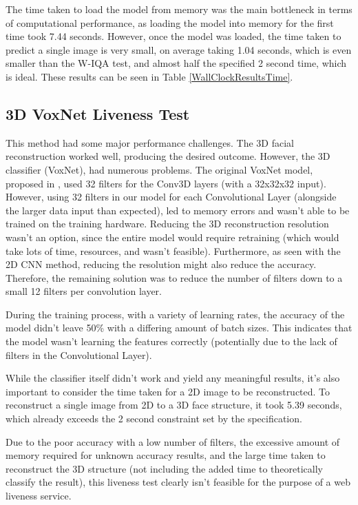 \documentclass[10pt,a4paper]{article}
\begin{document}
        The time taken to load the model from memory was the main bottleneck in terms of computational performance, as loading the model into memory for the first time took 7.44 seconds. However, once the model was loaded,
        the time taken to predict a single image is very small, on average taking 1.04 seconds, which is even smaller than the W-IQA test, and almost half the specified 2 second time, which is ideal. These results can be seen in Table \ref{WallClockResultsTime}.     

    \subsection{3D VoxNet Liveness Test}
        This method had some major performance challenges. The 3D facial reconstruction worked well, producing the desired outcome. However, the 3D classifier (VoxNet), had numerous problems.
        The original VoxNet model, proposed in \cite{VoxNetModel}, used 32 filters for the Conv3D layers (with a 32x32x32 input). However, using 32 filters in our model for each Convolutional Layer (alongside the larger data input than expected),
        led to memory errors and wasn't able to be trained on the training hardware.  Reducing the 3D reconstruction resolution wasn't an option, since the entire model would require retraining (which would take lots of time, resources, and wasn't feasible).
        Furthermore, as seen with the 2D CNN method, reducing the resolution might also reduce the accuracy. Therefore, the remaining solution was to reduce the number of filters down to a small 12 filters per convolution layer.

        During the training process, with a variety of learning rates, the accuracy of the model didn't leave 50\% with a differing amount of batch sizes. This indicates that the model wasn't learning the features correctly (potentially due to the lack of filters in the Convolutional Layer).
        
        While the classifier itself didn't work and yield any meaningful results, it's also important to consider the time taken for a 2D image to be reconstructed. 
        To reconstruct a single image from 2D to a 3D face structure, it took 5.39 seconds, which already exceeds the 2 second constraint set by the specification.

        Due to the poor accuracy with a low number of filters, the excessive amount of memory required for unknown accuracy results, and the large time taken to reconstruct the 3D structure (not including the added time to theoretically classify the result),
        this liveness test clearly isn't feasible for the purpose of a web liveness service.
\end{document}
